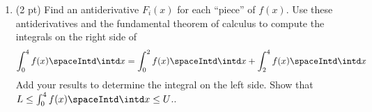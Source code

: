 


\begin{enumerate}[resume,label=(\alph*)]
\item\label{itm : LQ14c} (2 pt) Find an antiderivative $F_{i}(x)$ for each ``piece'' of $f(x)$. Use these antiderivatives and the fundamental theorem of calculus to compute the integrals on the right side of
\begin{align}
\int_{0}^{4} f(x) \spaceIntd \intd x
=
\int_{0}^{2} f(x) \spaceIntd \intd x
+
\int_{2}^{4} f(x) \spaceIntd \intd x%
\label{eq : LQ14 Piecewise Integral}
\end{align}
Add your results to determine the integral on the left side. Show that $L \leq \int_{0}^{4} f(x) \spaceIntd \intd x \leq U$..
\end{enumerate}


